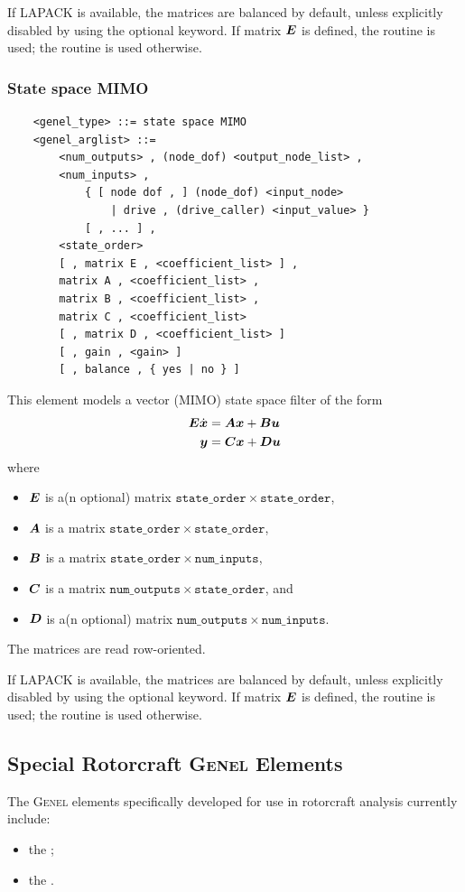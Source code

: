 If LAPACK is available, the matrices are balanced by default,
unless explicitly disabled by using the  optional keyword.
If matrix $\boldsymbol{E}$ is defined, the  routine is used;
the  routine is used otherwise.

\subsubsection{State space MIMO}
\begin{verbatim}
    <genel_type> ::= state space MIMO
    <genel_arglist> ::=
        <num_outputs> , (node_dof) <output_node_list> ,
        <num_inputs> ,
            { [ node dof , ] (node_dof) <input_node>
                | drive , (drive_caller) <input_value> }
            [ , ... ] ,
        <state_order>
        [ , matrix E , <coefficient_list> ] ,
        matrix A , <coefficient_list> ,
        matrix B , <coefficient_list> ,
        matrix C , <coefficient_list>
        [ , matrix D , <coefficient_list> ]
        [ , gain , <gain> ]
        [ , balance , { yes | no } ]
\end{verbatim}
This element models a vector (MIMO) state space filter of the form
\begin{align*}
        \boldsymbol{E} \dot{\boldsymbol{x}} &= \boldsymbol{A}\boldsymbol{x}+\boldsymbol{B}\boldsymbol{u} \\
	\boldsymbol{y} &= \boldsymbol{C}\boldsymbol{x}+\boldsymbol{D}\boldsymbol{u}
\end{align*}
where
\begin{itemize}
\item $\boldsymbol{E}$ is a(n optional) matrix
	$\mathtt{state\_order} \times \mathtt{state\_order}$,
\item $\boldsymbol{A}$ is a matrix
	$\mathtt{state\_order} \times \mathtt{state\_order}$,
\item $\boldsymbol{B}$ is a matrix
	$\mathtt{state\_order} \times \mathtt{num\_inputs}$,
\item $\boldsymbol{C}$ is a matrix
	$\mathtt{num\_outputs} \times \mathtt{state\_order}$, and
\item $\boldsymbol{D}$ is a(n optional) matrix
	$\mathtt{num\_outputs} \times \mathtt{num\_inputs}$.
\end{itemize}
The matrices are read row-oriented.

If LAPACK is available, the matrices are balanced by default,
unless explicitly disabled by using the  optional keyword.
If matrix $\boldsymbol{E}$ is defined, the  routine is used;
the  routine is used otherwise.


\subsection{Special Rotorcraft \textsc{Genel} Elements}
The \textsc{Genel} elements specifically developed for use
in rotorcraft analysis currently include:
\begin{itemize}
\item the ;
\item the .
\end{itemize}


